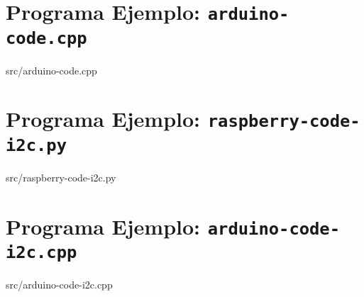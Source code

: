 %
%


\cleardoublepage{}
\section{Programa Ejemplo: \texttt{arduino-code.cpp}}%
\label{sec:appendix1}
%
{src/arduino-code.cpp}

\cleardoublepage{}
\section{Programa Ejemplo: \texttt{raspberry-code-i2c.py}}%
\label{sec:appendix2}
%
{src/raspberry-code-i2c.py}

\cleardoublepage{}
\section{Programa Ejemplo: \texttt{arduino-code-i2c.cpp}}%
\label{sec:appendix3}
%
{src/arduino-code-i2c.cpp}
